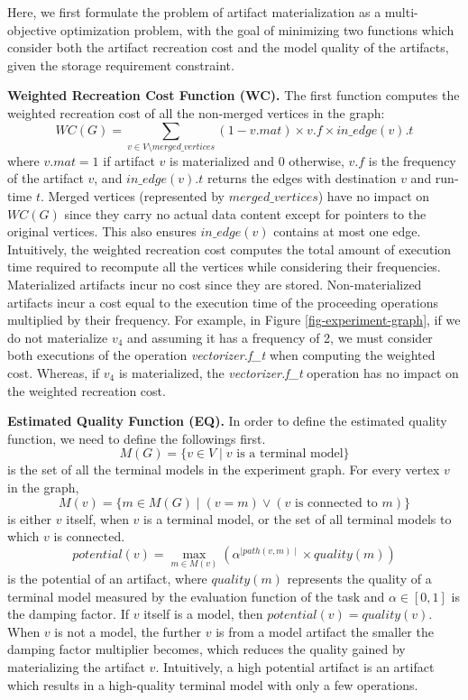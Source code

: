 Here, we first formulate the problem of artifact materialization as a multi-objective optimization problem, with the goal of minimizing two functions which consider both the artifact recreation cost and the model quality of the artifacts, given the storage requirement constraint.

\textbf{Weighted Recreation Cost Function (WC).} 
The first function computes the weighted recreation cost of all the non-merged vertices in the graph:
\[
WC(G) =  \sum\limits_{v \in V\setminus merged\_vertices}  (1-v.mat) \times v.f \times in\_edge(v).t
\]
where $v.mat = 1$ if artifact $v$ is materialized and $0$ otherwise, $v.f$ is the frequency of the artifact $v$, and $in\_edge(v).t$ returns the edges with destination $v$ and run-time $t$.
Merged vertices (represented by $merged\_vertices$) have no impact on $WC(G)$ since they carry no actual data content except for pointers to the original vertices.
This also ensures $in\_edge(v)$ contains at most one edge.
Intuitively, the weighted recreation cost computes the total amount of execution time required to recompute all the vertices while considering their frequencies.
Materialized artifacts incur no cost since they are stored.
Non-materialized artifacts incur a cost equal to the execution time of the proceeding operations multiplied by their frequency.
For example, in Figure \ref{fig-experiment-graph}, if we do not materialize $v_4$ and assuming it has a frequency of 2, we must consider both executions of the operation \textit{vectorizer.f\_t}  when computing the weighted cost.
Whereas, if $v_4$ is materialized, the \textit{vectorizer.f\_t} operation has no impact on the weighted recreation cost.

\textbf{Estimated Quality Function (EQ).} 
In order to define the estimated quality function, we need to define the followings first.
\[
M(G) = \{v \in V \mid v \text{ is a terminal model}\}
\]
is the set of all the terminal models in the experiment graph.
For every vertex $v$ in the graph, 
\[
M(v) = \{m \in M(G) \mid (v = m) \vee (v \text{ is connected to } m)\}
\]
is either $v$ itself, when $v$ is a terminal model, or the set of all terminal models to which $v$ is connected.
\[
potential(v) = \max\limits_{m \in M(v)} ( \alpha ^ {\mid path(v,m) \mid} \times quality(m) )
\]
is the potential of an artifact, where $quality(m)$ represents the quality of a terminal model measured by the evaluation function of the task and $\alpha \in [0,1]$ is the damping factor.
If $v$ itself is a model, then $potential(v) = quality(v)$.
When $v$ is not a model, the further $v$ is from a model artifact the smaller the damping factor multiplier becomes, which reduces the quality gained by materializing the artifact $v$.
Intuitively, a high potential artifact is an artifact which results in a high-quality terminal model with only a few operations.

